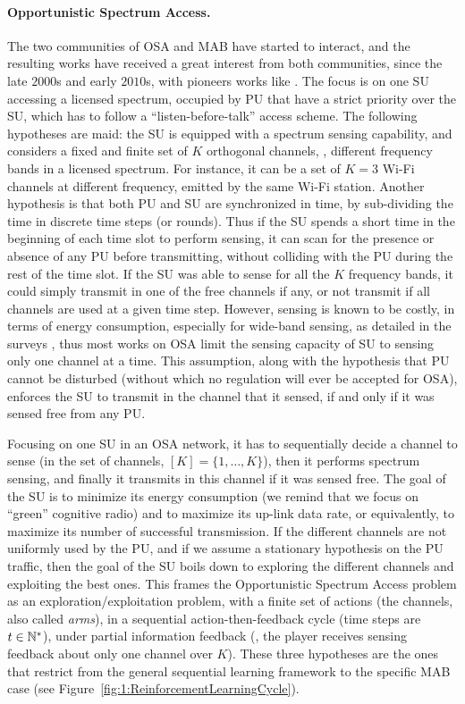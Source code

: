 \paragraph{Opportunistic Spectrum Access.}
%
The two communities of OSA and MAB have started to interact, and the resulting works have received a great interest from both communities, since the late $2000$s and early $2010$s, with pioneers works like \cite{Liu08,Zhao10,Jouini09,Jouini10}.
The focus is on one SU accessing a licensed spectrum, occupied by PU that have a strict priority over the SU, which has to follow a ``listen-before-talk'' access scheme.
%
The following hypotheses are maid:
the SU is equipped with a spectrum sensing capability,
and considers a fixed and finite set of $K$ orthogonal channels, \ie, different frequency bands in a licensed spectrum.
For instance, it can be a set of $K=3$ Wi-Fi channels at different frequency, emitted by the same Wi-Fi station.
Another hypothesis is that both PU and SU are synchronized in time, by sub-dividing the time in discrete time steps (or rounds).
%
Thus if the SU spends a short time in the beginning of each time slot to perform sensing, it can scan for the presence or absence of any PU before transmitting, without colliding with the PU during the rest of the time slot.
If the SU was able to sense for all the $K$ frequency bands, it could simply transmit in one of the free channels if any, or not transmit if all channels are used at a given time step.
However, sensing is known to be costly, in terms of energy consumption, especially for wide-band sensing, as detailed in the surveys \cite{yucek2009survey,subhedar2011spectrum}, thus most works on OSA limit the sensing capacity of SU to sensing only one channel at a time.
This assumption, along with the hypothesis that PU cannot be disturbed (without which no regulation will ever be accepted for OSA), enforces the SU to transmit in the channel that it sensed, if and only if it was sensed free from any PU.

Focusing on one SU in an OSA network, it has to sequentially decide a channel to sense (in the set of channels, $[K]=\{1,\dots,K\}$), then it performs spectrum sensing, and finally it transmits in this channel if it was sensed free.
The goal of the SU is to minimize its energy consumption (we remind that we focus on ``green'' cognitive radio) and to maximize its up-link data rate, or equivalently, to maximize its number of successful transmission.
%
If the different channels are not uniformly used by the PU, and if we assume a stationary hypothesis on the PU traffic, then the goal of the SU boils down to exploring the different channels and exploiting the best ones.
This frames the Opportunistic Spectrum Access problem as an exploration/exploitation problem,
with a finite set of actions (the channels, also called \emph{arms}),
in a sequential action-then-feedback cycle (time steps are $t\in\mathbb{N}^*$),
under partial information feedback (\ie, the player receives sensing feedback about only one channel over $K$).
These three hypotheses are the ones that restrict from the general sequential learning framework to the specific MAB case (see Figure~\ref{fig:1:ReinforcementLearningCycle}).


